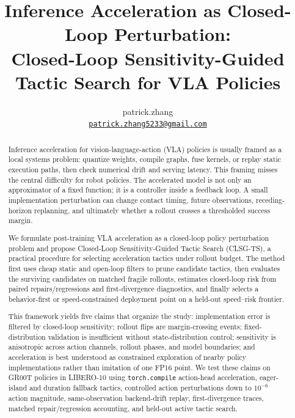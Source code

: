 \documentclass[10pt]{article}
\title{Inference Acceleration as Closed-Loop Perturbation:\\
Closed-Loop Sensitivity-Guided Tactic Search for VLA Policies}
\author{patrick.zhang\\\href{mailto:patrick.zhang5233@gmail.com}{\texttt{patrick.zhang5233@gmail.com}}}
\date{}
\begin{document}
\maketitle

\begin{abstract}
Inference acceleration for vision-language-action (VLA) policies is usually framed as a local systems problem: quantize weights, compile graphs, fuse kernels, or replay static execution paths, then check numerical drift and serving latency. This framing misses the central difficulty for robot policies. The accelerated model is not only an approximator of a fixed function; it is a controller inside a feedback loop. A small implementation perturbation can change contact timing, future observations, receding-horizon replanning, and ultimately whether a rollout crosses a thresholded success margin.

We formulate post-training VLA acceleration as a closed-loop policy perturbation problem and propose Closed-Loop Sensitivity-Guided Tactic Search (CLSG-TS), a practical procedure for selecting acceleration tactics under rollout budget. The method first uses cheap static and open-loop filters to prune candidate tactics, then evaluates the surviving candidates on matched fragile rollouts, estimates closed-loop risk from paired repairs/regressions and first-divergence diagnostics, and finally selects a behavior-first or speed-constrained deployment point on a held-out speed--risk frontier.

This framework yields five claims that organize the study: implementation error is filtered by closed-loop sensitivity; rollout flips are margin-crossing events; fixed-distribution validation is insufficient without state-distribution control; sensitivity is anisotropic across action channels, rollout phases, and model boundaries; and acceleration is best understood as constrained exploration of nearby policy implementations rather than imitation of one FP16 point. We test these claims on GR00T policies in LIBERO-10 using \texttt{torch.compile} action-head acceleration, eager-island and duration fallback tactics, controlled action perturbations down to $10^{-6}$ action magnitude, same-observation backend-drift replay, first-divergence traces, matched repair/regression accounting, and held-out active tactic search.


\end{abstract}
\end{document}
